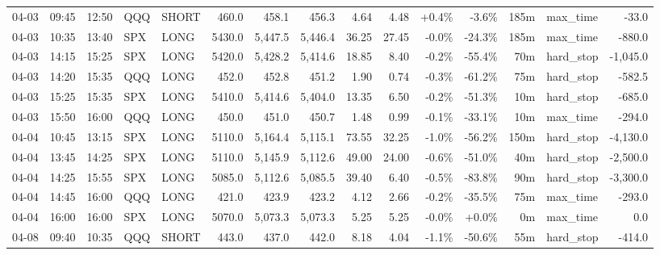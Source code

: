 \documentclass[11pt,a4paper,twoside]{article}
\begin{document}
\begin{landscape}
\begin{center}
\begin{longtable}{>{\color{txtmain}}l l l l l r r r r r r r r >{\color{txtmain}}l r}
04-03 & 09:45 & 12:50 & QQQ & SHORT & 460.0 & 458.1 & 456.3 & 4.64 & 4.48 & \textcolor{wingreen}{+0.4\%} & \textcolor{lossred}{-3.6\%} & 185m & max\_time & \textcolor{lossred}{-33.0} \\
04-03 & 10:35 & 13:40 & SPX & LONG & 5430.0 & 5,447.5 & 5,446.4 & 36.25 & 27.45 & \textcolor{lossred}{-0.0\%} & \textcolor{lossred}{-24.3\%} & 185m & max\_time & \textcolor{lossred}{-880.0} \\
04-03 & 14:15 & 15:25 & SPX & LONG & 5420.0 & 5,428.2 & 5,414.6 & 18.85 & 8.40 & \textcolor{lossred}{-0.2\%} & \textcolor{lossred}{-55.4\%} & 70m & hard\_stop & \textcolor{lossred}{-1,045.0} \\
04-03 & 14:20 & 15:35 & QQQ & LONG & 452.0 & 452.8 & 451.2 & 1.90 & 0.74 & \textcolor{lossred}{-0.3\%} & \textcolor{lossred}{-61.2\%} & 75m & hard\_stop & \textcolor{lossred}{-582.5} \\
04-03 & 15:25 & 15:35 & SPX & LONG & 5410.0 & 5,414.6 & 5,404.0 & 13.35 & 6.50 & \textcolor{lossred}{-0.2\%} & \textcolor{lossred}{-51.3\%} & 10m & hard\_stop & \textcolor{lossred}{-685.0} \\
04-03 & 15:50 & 16:00 & QQQ & LONG & 450.0 & 451.0 & 450.7 & 1.48 & 0.99 & \textcolor{lossred}{-0.1\%} & \textcolor{lossred}{-33.1\%} & 10m & max\_time & \textcolor{lossred}{-294.0} \\
04-04 & 10:45 & 13:15 & SPX & LONG & 5110.0 & 5,164.4 & 5,115.1 & 73.55 & 32.25 & \textcolor{lossred}{-1.0\%} & \textcolor{lossred}{-56.2\%} & 150m & hard\_stop & \textcolor{lossred}{-4,130.0} \\
04-04 & 13:45 & 14:25 & SPX & LONG & 5110.0 & 5,145.9 & 5,112.6 & 49.00 & 24.00 & \textcolor{lossred}{-0.6\%} & \textcolor{lossred}{-51.0\%} & 40m & hard\_stop & \textcolor{lossred}{-2,500.0} \\
04-04 & 14:25 & 15:55 & SPX & LONG & 5085.0 & 5,112.6 & 5,085.5 & 39.40 & 6.40 & \textcolor{lossred}{-0.5\%} & \textcolor{lossred}{-83.8\%} & 90m & hard\_stop & \textcolor{lossred}{-3,300.0} \\
04-04 & 14:45 & 16:00 & QQQ & LONG & 421.0 & 423.9 & 423.2 & 4.12 & 2.66 & \textcolor{lossred}{-0.2\%} & \textcolor{lossred}{-35.5\%} & 75m & max\_time & \textcolor{lossred}{-293.0} \\
04-04 & 16:00 & 16:00 & SPX & LONG & 5070.0 & 5,073.3 & 5,073.3 & 5.25 & 5.25 & \textcolor{lossred}{-0.0\%} & \textcolor{wingreen}{+0.0\%} & 0m & max\_time & \textcolor{wingreen}{0.0} \\
04-08 & 09:40 & 10:35 & QQQ & SHORT & 443.0 & 437.0 & 442.0 & 8.18 & 4.04 & \textcolor{lossred}{-1.1\%} & \textcolor{lossred}{-50.6\%} & 55m & hard\_stop & \textcolor{lossred}{-414.0} \\

\end{longtable}
\end{center}
\end{landscape}
\end{document}
